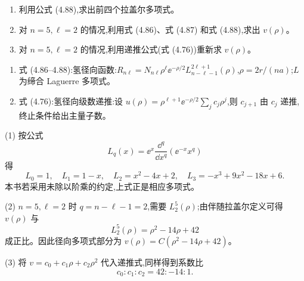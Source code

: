 \begin{question}
\begin{enumerate}
\item 利用公式 (4.88),求出前四个拉盖尔多项式。
\item 对 $n=5,\ell=2$ 的情况,利用式 (4.86)、式 (4.87) 和式 (4.88),求出 $v(\rho)$。
\item 对 $n=5,\ell=2$ 的情况,利用递推公式(式 (4.76))重新求 $v(\rho)$。
\end{enumerate}

\par\smallskip
{}
\begin{enumerate}[leftmargin=2.2em,itemsep=0.12em,topsep=0.12em,parsep=0pt]
\item 式 (4.86--4.88):氢径向函数:$R_{n\ell}=N_{n\ell}\rho^\ell \ee^{-\rho/2}L_{n-\ell-1}^{2\ell+1}(\rho)$,$\rho=2r/(na)$;$L$ 为缔合 Laguerre 多项式。
\item 式 (4.76):氢径向级数递推:设 $u(\rho)=\rho^{\ell+1}\ee^{-\rho/2}\sum_j c_j\rho^j$,则 $c_{j+1}$ 由 $c_j$ 递推,终止条件给出主量子数。
\end{enumerate}

\end{question}
\begin{solution}

(1) 按公式
\[
L_q(x)=\ee^x\frac{\dd^q}{\dd x^q}(\ee^{-x}x^q)
\]
得
\[
L_0=1,
\quad L_1=1-x,
\quad L_2=x^2-4x+2,
\quad L_3=-x^3+9x^2-18x+6.
\]
本书若采用未除以阶乘的约定,上式正是相应多项式。

(2) $n=5,\ell=2$ 时 $q=n-\ell-1=2$,需要 $L_2^{5}(\rho)$;由伴随拉盖尔定义可得 $v(\rho)$ 与
\[
L_2^5(\rho)=\rho^2-14\rho+42
\]
成正比。因此径向多项式部分为 $v(\rho)=C(\rho^2-14\rho+42)$。

(3) 将 $v=c_0+c_1\rho+c_2\rho^2$ 代入递推式,同样得到系数比
\[
c_0:c_1:c_2=42:-14:1.
\]

\end{solution}

